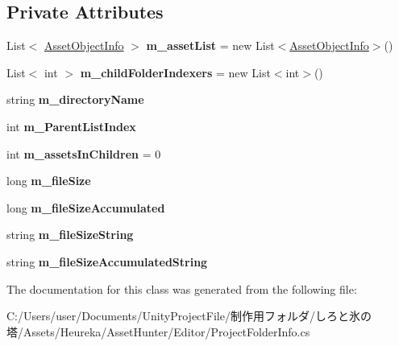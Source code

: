 \subsection*{Private Attributes}
\begin{DoxyCompactItemize}
\item 
\mbox{\label{class_heureka_games_1_1_project_folder_info_a76fb54f8f0480c03b38cf627df5a69ee}} 
List$<$ \hyperlink{class_heureka_games_1_1_asset_object_info}{Asset\+Object\+Info} $>$ {\bfseries m\+\_\+asset\+List} = new List$<$\hyperlink{class_heureka_games_1_1_asset_object_info}{Asset\+Object\+Info}$>$()
\item 
\mbox{\label{class_heureka_games_1_1_project_folder_info_a3968b09513632b955ce201f003e56123}} 
List$<$ int $>$ {\bfseries m\+\_\+child\+Folder\+Indexers} = new List$<$int$>$()
\item 
\mbox{\label{class_heureka_games_1_1_project_folder_info_a650693664e94286eae49c22f72a4e397}} 
string {\bfseries m\+\_\+directory\+Name}
\item 
\mbox{\label{class_heureka_games_1_1_project_folder_info_a0d25731f8c57f67ef0ff7b10445d6bf4}} 
int {\bfseries m\+\_\+\+Parent\+List\+Index}
\item 
\mbox{\label{class_heureka_games_1_1_project_folder_info_a9c3be74f0da4fbe04efbfd1f78d55aca}} 
int {\bfseries m\+\_\+assets\+In\+Children} = 0
\item 
\mbox{\label{class_heureka_games_1_1_project_folder_info_a85460f1fc26d6f755ff8c1f160a08b8c}} 
long {\bfseries m\+\_\+file\+Size}
\item 
\mbox{\label{class_heureka_games_1_1_project_folder_info_a285bc7c007d624614f4c2dbf0b203054}} 
long {\bfseries m\+\_\+file\+Size\+Accumulated}
\item 
\mbox{\label{class_heureka_games_1_1_project_folder_info_a3b40187d7f8f17cedbcae2d473ee681c}} 
string {\bfseries m\+\_\+file\+Size\+String}
\item 
\mbox{\label{class_heureka_games_1_1_project_folder_info_ab20a1aee909891fa90c2c8be2d3b1cba}} 
string {\bfseries m\+\_\+file\+Size\+Accumulated\+String}
\end{DoxyCompactItemize}


The documentation for this class was generated from the following file\+:\begin{DoxyCompactItemize}
\item 
C\+:/\+Users/user/\+Documents/\+Unity\+Project\+File/制作用フォルダ/しろと氷の塔/\+Assets/\+Heureka/\+Asset\+Hunter/\+Editor/Project\+Folder\+Info.\+cs\end{DoxyCompactItemize}
